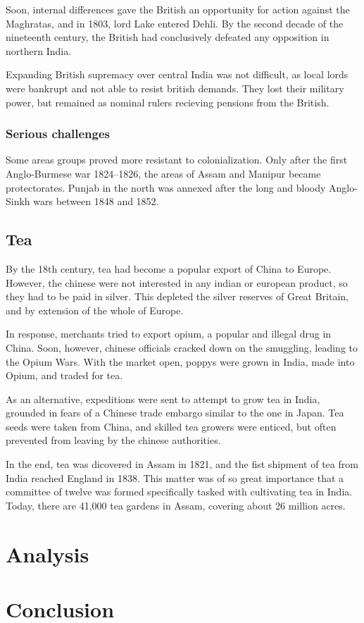 \documentclass[11pt, a4paper, headings=standardclasses]{scrartcl}
\begin{document}
Soon, internal differences gave the British an opportunity for action against the Magh\-ratas, and in 1803, lord Lake entered Dehli. By the second decade of the nineteenth century, the British had conclusively defeated any opposition in northern India.\autocite[274]{RF}

Expanding British supremacy over central India was not difficult, as local lords were bankrupt and not able to resist british demands. They lost their military power, but remained as nominal rulers recieving pensions from the British.\autocite[276]{RF}

\subsubsection{Serious challenges}

Some areas groups proved more resistant to colonialization. Only after the first Anglo-Burmese war 1824--1826, the areas of Assam and Manipur became protectorates. Punjab in the north was annexed after the long and bloody Anglo-Sinkh wars between 1848 and 1852.\autocite[277]{RF}

\subsection{Tea}

By the 18th century, tea had become a popular export of China to Europe. However, the chinese were not interested in any indian or european product, so they had to be paid in silver. This depleted the silver reserves of Great Britain, and by extension of the whole of Europe.\autocite{Tea}

In response, merchants tried to export opium, a popular and illegal drug in China. Soon, however, chinese officials cracked down on the smuggling, leading to the Opium Wars.\autocite{Opium} With the market open, poppys were grown in India, made into Opium, and traded for tea.\autocite{Tea}

As an alternative, expeditions were sent to attempt to grow tea in India, grounded in fears of a Chinese trade embargo similar to the one in Japan. Tea seeds were taken from China, and skilled tea growers were enticed, but often prevented from leaving by the chinese authorities.\autocite{Tea}

In the end, tea was dicovered in Assam in 1821, and the fist shipment of tea from India reached England in 1838. This matter was of so great importance that a committee of twelve was formed specifically tasked with cultivating tea in India. Today, there are 41,000 tea gardens in Assam, covering about 26 million acres.\autocite{roy}

\section{Analysis}
\section{Conclusion}
\clearpage
\appendix
\printbibliography
\end{document}

